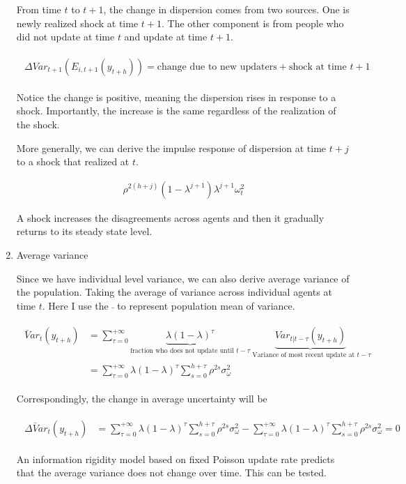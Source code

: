 \documentclass[]{article}
\begin{document}
\begin{enumerate}
From time $t$ to $t+1$, the change in dispersion comes from two sources. One is newly realized shock at time $t+1$. The other component is from people who did not update at time $t$ and update at time $t+1$.  

\begin{eqnarray}
\begin{aligned}
\Delta Var_{t+1}(E_{i,t+1}(y_{t+h})) = \textrm{change due to new updaters} + \textrm{shock at time } t+1 
\end{aligned}
\end{eqnarray}


Notice the change is positive, meaning the dispersion rises in response to a shock. Importantly, the increase is the same regardless of the realization of the shock. 

More generally, we can derive the impulse response of dispersion at time $t+j$ to a shock that realized at $t$. 

\begin{eqnarray}
\rho^{2(h+j)} (1-\lambda^{j+1})\lambda^{j+1} \omega^2_t
\end{eqnarray}


A shock increases the disagreements across agents and then it gradually returns to its steady state level. 

\item Average variance

Since we have individual level variance, we can also derive average variance of the population. Taking the average of variance across individual agents at time $t$. Here I use the $\bar{}$ to represent population mean of variance. 

\begin{eqnarray}
\begin{aligned}
\bar Var_{t}(y_{t+h}) & = \sum^{+\infty}_{\tau =0} \underbrace{\lambda (1-\lambda)^\tau}_{\text{fraction who does not update until }t-\tau} \underbrace{Var_{t|t-\tau}(y_{t+h})}_{\text{ Variance of most recent update at }t-\tau} \\
& = \sum^{+\infty}_{\tau =0} \lambda (1-\lambda)^\tau \sum^{h+\tau}_{s=0}\rho^{2s} \sigma^2_{\omega}
\end{aligned}
\end{eqnarray}

Correspondingly, the change in average uncertainty will be 


\begin{eqnarray}
\begin{aligned}
\Delta \bar Var_{t}(y_{t+h}) & = \sum^{+\infty}_{\tau =0} \lambda (1-\lambda)^\tau \sum^{h+\tau}_{s=0}\rho^{2s} \sigma^2_{\omega} - \sum^{+\infty}_{\tau =0} \lambda (1-\lambda)^\tau \sum^{h+\tau}_{s=0}\rho^{2s} \sigma^2_{\omega} = 0  
\end{aligned}
\end{eqnarray}

An information rigidity model based on fixed Poisson update rate predicts that the average variance does not change over time. This can be tested.

\end{enumerate}
\end{document}
